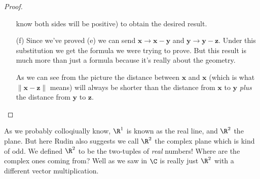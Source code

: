 \begin{proof}
\begin{itemize}
            know both sides will be positive) to obtain the desired result.
        \item[(f)] Since we've proved (e) we can send $\mathbf{x}\to\mathbf{x} - \mathbf{y}$
            and $\mathbf{y}\to\mathbf{y} - \mathbf{z}$. Under this substitution we
            get the formula we were trying to prove. But this result is much more
            than just a formula because it's really about the geometry.
            \begin{center}
            \end{center}
            As we can see from the picture the distance between $\mathbf{x}$ and
            $\mathbf{x}$ (which is what $\|\mathbf{x} - \mathbf{z}\|$ means) will
            always be shorter than the distance from $\mathbf{x}$ to $\mathbf{y}$
            \emph{plus} the distance from $\mathbf{y}$ to $\mathbf{z}$.
    \end{itemize}
\end{proof}

As we probably colloqiually know, $\R^1$ is known as the real line, and $\R^2$
the plane. But here Rudin also suggests we call $\R^2$ the complex plane which
is kind of odd. We defined $\R^2$ to be the two-tuples of \emph{real} numbers!
Where are the complex ones coming from? Well as we saw in
$\C$ is really just $\R^2$ with a different vector multiplication.

